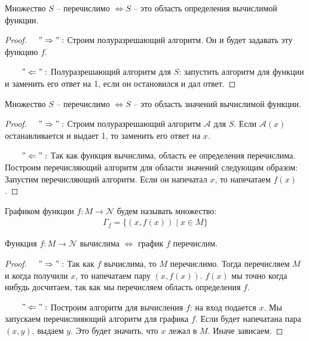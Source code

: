\begin{lemma}
    Множество $S$ -- перечислимо $\Longleftrightarrow S$ -- это область определения вычислимой функции. 
\end{lemma}
\begin{proof}
    \quad 

    \quad $\quad"\Rightarrow":$ Строим полуразрешающий алгоритм. Он и будет задавать эту функцию $f$.

    $\quad\quad "\Leftarrow":$ Полуразрешающий алгоритм для $S$: запустить алгоритм для функции и заменить его ответ на 1, если он остановился и дал ответ.

\end{proof}

\begin{lemma}
    Множество $S$ -- перечислимо $\Longleftrightarrow S$ -- это область значений вычислимой функции. 
\end{lemma}
\begin{proof}
    \quad 

    \quad $\quad"\Rightarrow":$ Строим полуразрешающий алгоритм $\mathcal{A}$ для $S$. Если $\mathcal{A}(x)$ останавливается и выдает 1, то заменить его ответ на $x$.

    $\quad\quad "\Leftarrow":$ Так как функция вычислима, область ее определения перечислима. Построим перечисляющий алгоритм для области значений следующим образом: Запустим перечисляющий алгоритм. Если он напечатал $x$, то напечатаем $f(x)$. 

\end{proof}

\begin{conj}
    Графиком функции $f : M \longrightarrow \mathcal{N}$ будем называть множество:
    \begin{gather*}
        \Gamma_f = \{(x, f(x)) \mid x \in M\}
    \end{gather*}
\end{conj}
\begin{theorem}
    Функция $f : M \longrightarrow \mathcal{N}$ вычислима $\Longleftrightarrow$ график $f$ перечислим. 
\end{theorem}
\begin{proof}
    \quad 

    \quad $\quad"\Rightarrow":$ Так как $f$ вычислима, то $M$ перечислимо. Тогда перечисляем $M$ и когда получили $x$, то напечатаем пару $(x, f(x))$. $f(x)$ мы точно когда нибудь досчитаем, так как мы перечисляем область определения $f$. 

    $\quad\quad "\Leftarrow":$ Построим алгоритм для вычисления $f$: на вход подается $x$. Мы запускаем перечислияющий алгоритм для графика $f$. Если будет напечатана пара $(x, y)$, выдаем $y$. Это будет значить, что $x$ лежал в $M$. Иначе зависаем. 

\end{proof}


